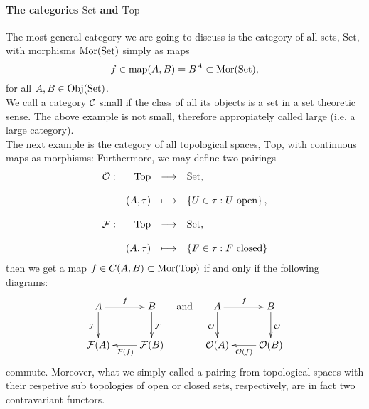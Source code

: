 \paragraph{The categories $\mathrm{Set}$ and $\mathrm{Top}$}
The most general category we are going to discuss is the category of all sets, $\mathrm{Set}$, with morphisms $\mathrm{Mor}(\mathrm{Set})$ simply as maps
$$f \in \mathrm{map}(A,B) = B^A \subset \mathrm{Mor}(\mathrm{Set}),$$
for all $A, B \in \mathrm{Obj}({\mathrm{Set}})$.\\
We call a category $\mathcal{C}$ small if the class of all its objects is a set in a set theoretic sense. The above example is not small, therefore appropiately called large (i.e. a large category).\\
\indent The next example is the category of all topological spaces, $\mathrm{Top}$, with continuous maps as morphisms:
Furthermore, we may define two pairings
$$\begin{array}{rrcl}
\call{O} :& \mathrm{Top} &\longrightarrow& \mathrm{Set},\\
&&&\\
& (A, \tau) &\longmapsto &\left\{U \in \tau :  U\ \mathrm{open}\right\},\\
&&&\\
\call{F} :& \mathrm{Top}&\longrightarrow& \mathrm{Set},\\
&&&\\
&(A, \tau) &\longmapsto& \left\{F \in \tau : F \ \mathrm{closed}\right\}\\
\end{array}\\
$$
then we get a map $f \in C(A,B) \subset \mathrm{Mor}(\mathrm{Top})$ if and only if the following diagrams:
$$\begin{array}{ccc}
\xymatrix{
A \ar[r]^f\ar[d]_{\call{F}} & B\ar[d]^{\call{F}}\\
\call{F}(A) &\call{F}(B)\ar[l]^{\call{F}(f)}\\
}&\mathrm{and}&\xymatrix{
A \ar[r]^f\ar[d]_{\call{O}} & B\ar[d]^{\call{O}}\\
\call{O}(A) &\call{O}(B)\ar[l]^{\call{O}(f)}\\
}\\
\end{array}
$$
commute. Moreover, what we simply called a pairing from topological spaces with their respetive sub topologies of open or closed sets, respectively, are in fact two contravariant functors.
